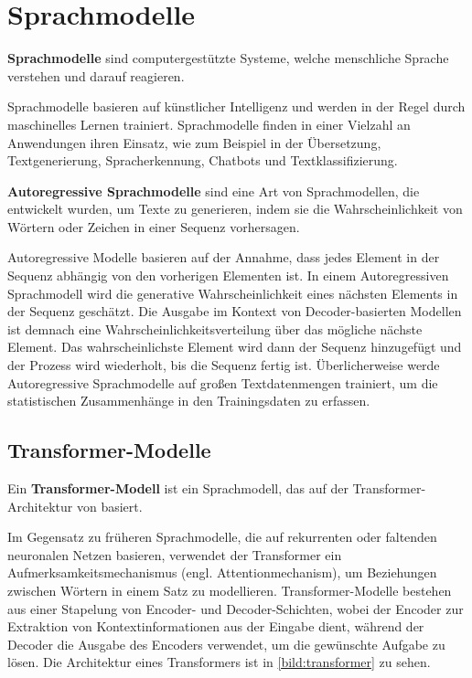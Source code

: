 \section{Sprachmodelle}\label{sec:sprachmodelle}

\begin{definition}\label{def:sprachmodell}
   \textbf{Sprachmodelle} sind computergestützte Systeme, welche menschliche Sprache  verstehen und darauf reagieren.
\end{definition}
Sprachmodelle basieren auf künstlicher Intelligenz und werden in der Regel durch maschinelles Lernen trainiert.
Sprachmodelle finden in einer Vielzahl an Anwendungen ihren Einsatz, wie zum Beispiel in der Übersetzung,
Textgenerierung, Spracherkennung, Chatbots und Textklassifizierung.

\begin{definition}\label{def:autoregressive-sprachmodelle}
    \textbf{Autoregressive Sprachmodelle} sind eine Art von Sprachmodellen, die entwickelt wurden, um Texte zu generieren,
    indem sie die Wahrscheinlichkeit von Wörtern oder Zeichen in einer Sequenz vorhersagen.
\end{definition}

Autoregressive Modelle basieren auf der Annahme, dass jedes Element in der Sequenz abhängig von den vorherigen Elementen ist.
In einem Autoregressiven Sprachmodell wird die generative Wahrscheinlichkeit eines nächsten Elements in der Sequenz geschätzt.
Die Ausgabe im Kontext von Decoder-basierten Modellen ist demnach eine Wahrscheinlichkeitsverteilung über das mögliche nächste Element.
Das wahrscheinlichste Element wird dann der Sequenz hinzugefügt und der Prozess wird wiederholt, bis die Sequenz fertig ist.
Überlicherweise werde Autoregressive Sprachmodelle auf großen Textdatenmengen trainiert, um die statistischen Zusammenhänge in den Trainingsdaten zu erfassen.

\subsection{Transformer-Modelle}\label{sec:grundlagen:transformer}

\begin{definition}\label{def:transformer-modell}
    Ein \textbf{Transformer-Modell} ist ein Sprachmodell, das auf der Transformer-Architektur von \citet{attention} basiert.
\end{definition}
Im Gegensatz zu früheren Sprachmodelle, die auf rekurrenten oder faltenden neuronalen Netzen basieren, verwendet der Transformer ein Aufmerksamkeitsmechanismus (engl. Attentionmechanism), um Beziehungen zwischen Wörtern in einem Satz zu modellieren.
Transformer-Modelle bestehen aus einer Stapelung von Encoder- und Decoder-Schichten, wobei der Encoder zur Extraktion von Kontextinformationen aus der Eingabe dient,
während der Decoder die Ausgabe des Encoders verwendet, um die gewünschte Aufgabe zu lösen.
Die Architektur eines Transformers ist in \cref{bild:transformer} zu sehen.\\

